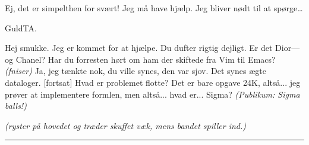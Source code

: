 \documentclass{article}
\begin{document}
\newpage%
\begin{sketch}


 Ej, det er simpelthen for svært! Jeg må have hjælp. Jeg bliver nødt til at spørge\dots

GuldTA.


 Hej smukke. Jeg er kommet for at hjælpe.
 Du dufter rigtig dejligt. Er det Dior---og Chanel?
 Har du forresten hørt om ham der skiftede fra Vim til Emacs?
 \textit{(fniser)}
 Ja, jeg tænkte nok, du ville synes, den var sjov.
Det synes ægte dataloger.
[fortsat] Hvad er problemet flotte?
 Det er bare opgave 24K, altså... jeg prøver at implementere formlen, men altså... hvad er... Sigma? \textit{(Publikum: Sigma balls!)}


 \textit{(ryster på hovedet og træder skuffet væk, mens bandet spiller ind.)}

\end{sketch}

\smallskip\hfil\rule{6cm}{0.1mm}\medskip\par
\clearpage
\end{document}
